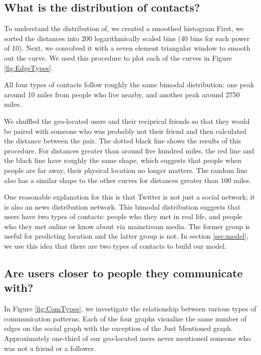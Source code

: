 \documentclass{sig-alternate}
\begin{document}
\subsection{What is the distribution of contacts?}
To understand the distribution of, we created a smoothed histogram 
First, we sorted the distances into 200 logarithmically scaled bins (40 bins for each power of 10). Next, we convolved it with a seven element triangular window to smooth out the curve.
We used this procedure to plot each of the curves in Figure \ref{fig:EdgeTypes}.

All four types of contacts follow roughly the same bimodal distribution:
one peak around 10 miles from people who live nearby, and another peak around
2750 miles.

We shuffled the geo-located users and their reciprical friends so that they
would be paired with someone who was probably not their friend and then
calculated the distance between the pair.
The dotted black line
shows the results of this procedure. For distances greater than around five
hundred miles, the red line and the black line have roughly the same shape,
which suggests that people when people are far away, their physical location no
longer matters.
The random line also has a similar shape to the other curves for distances
greater than 100 miles.

One reasonable explanation for this is that Twitter is not just a social
network; it is also an news distribution network.  This bimodal distribution
suggests that users have two types of contacts: people who they met in
real life, and people who they met online or know about via mainstream media.
The former group is useful for predicting location and the latter group is not.
In section \ref{sec:model}, we use this idea that there are two types of
contacts to build our model.

\subsection{Are users closer to people they communicate with?}
\begin{figure*}
\centering
{}
\caption{
CDF of the distance between a geo-located user and various types of contacts ploted on a logarithmic scale.
In these graphs, "I" refers to the geo-located user. "You" refers to their contact. 
}
\label{fig:ComTypes}
\end{figure*}
In Figure \ref{fig:ComTypes}, we investigate the relationship between various 
types of communication patterns.
Each of the four graphs visualize the same number of edges on the social graph with the exception of the Just Mentioned graph. Approximately one-third of our geo-located users never mentioned someone who was not a friend or a follower.
\end{document}
